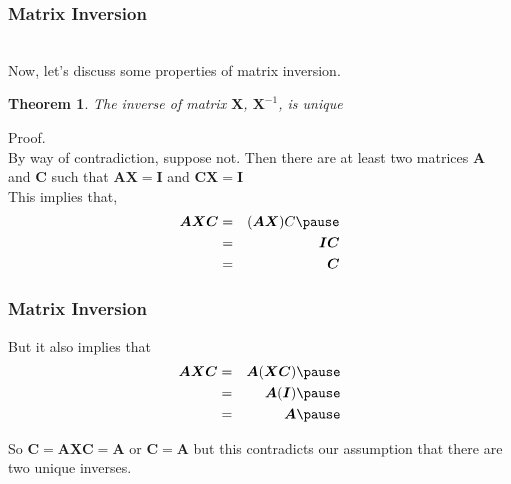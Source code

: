 \documentclass[handout]{beamer}
\newtheorem{thm}{Theorem}
\numberwithin{equation}{section}
\begin{document}
\begin{frame}
\frametitle{Matrix Inversion}

\ \\Now, let's discuss some properties of matrix inversion. \pause 

\begin{thm} 
The inverse of matrix $\boldsymbol{X}$, $\boldsymbol{X}^{-1}$, is unique
\end{thm}
\pause 

Proof. \\
By way of contradiction, suppose not. \pause Then there are at least two matrices $\boldsymbol{A}$ and $\boldsymbol{C}$ such that $\boldsymbol{AX} = \boldsymbol{I}$ and $\boldsymbol{CX} = \boldsymbol{I}$ \pause \\
This implies that, \pause
\begin{eqnarray}
\boldsymbol{AXC} & = & (\boldsymbol{A} \boldsymbol{X}) C \nonumber \pause \\
							& = & \boldsymbol{I}\boldsymbol{C} \nonumber \\
							& = & \boldsymbol{C}  \nonumber 
\end{eqnarray}							


\end{frame}

\begin{frame}
\frametitle{Matrix Inversion}

But it also implies that \pause
\begin{eqnarray}
\boldsymbol{AXC}  &  = & \boldsymbol{A}(\boldsymbol{X} \boldsymbol{C} ) \nonumber \pause \\
							&  = & \boldsymbol{A} (\boldsymbol{I} ) \nonumber \pause \\
							& = & \boldsymbol{A} \nonumber \pause
\end{eqnarray}							

So $\boldsymbol{C} = \boldsymbol{AXC}  = \boldsymbol{A}$ or $\boldsymbol{C} =\boldsymbol{A}$ \pause but this contradicts our assumption that there are two unique inverses.   

\end{frame}
\end{document}
